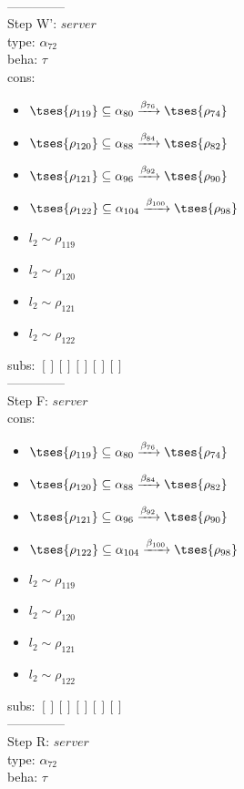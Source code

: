\documentclass[12pt]{article}
\begin{document}
\\ --------------\\
Step W': $ server $\\
  type: $ \alpha_{72} $ 
\\  beha: $ \tau $ 
\\  cons: \begin{itemize}
\item $  \tses{ \rho_{119}} \subseteq \alpha_{80} \xrightarrow{\beta_{76}}  \tses{ \rho_{74}} $
\item $  \tses{ \rho_{120}} \subseteq \alpha_{88} \xrightarrow{\beta_{84}}  \tses{ \rho_{82}} $
\item $  \tses{ \rho_{121}} \subseteq \alpha_{96} \xrightarrow{\beta_{92}}  \tses{ \rho_{90}} $
\item $  \tses{ \rho_{122}} \subseteq \alpha_{104} \xrightarrow{\beta_{100}}  \tses{ \rho_{98}} $
\item $ l_{2} \sim\rho_{119} $
\item $ l_{2} \sim\rho_{120} $
\item $ l_{2} \sim\rho_{121} $
\item $ l_{2} \sim\rho_{122} $
\end{itemize} 
  subs:  $ [ ] [] [] [] [] $  
 \\--------------\\ 
Step F: $ server $
 \\ cons: \begin{itemize}
\item $  \tses{ \rho_{119}} \subseteq \alpha_{80} \xrightarrow{\beta_{76}}  \tses{ \rho_{74}} $
\item $  \tses{ \rho_{120}} \subseteq \alpha_{88} \xrightarrow{\beta_{84}}  \tses{ \rho_{82}} $
\item $  \tses{ \rho_{121}} \subseteq \alpha_{96} \xrightarrow{\beta_{92}}  \tses{ \rho_{90}} $
\item $  \tses{ \rho_{122}} \subseteq \alpha_{104} \xrightarrow{\beta_{100}}  \tses{ \rho_{98}} $
\item $ l_{2} \sim\rho_{119} $
\item $ l_{2} \sim\rho_{120} $
\item $ l_{2} \sim\rho_{121} $
\item $ l_{2} \sim\rho_{122} $
\end{itemize}
 subs:  $ [ ] [] [] [] [] $ 
  \\--------------\\ 
Step R: $ server $\\
  type: $ \alpha_{72} $ 
\\  beha: $ \tau $ 
\end{document}
